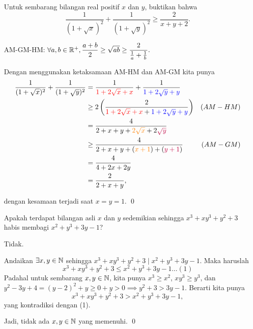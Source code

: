 \documentclass[12pt]{scrartcl}
\begin{document}
	\begin{soaljawab}
	Untuk sembarang bilangan real positif $x$ dan $y$, buktikan bahwa $$\dfrac{1}{(1+\sqrt{x})^2}+\dfrac{1}{(1+\sqrt{y})^2} \ge \dfrac{2}{x+y+2}.$$
	\begin{solusi}
	
	\begin{lemmarev}
	AM-GM-HM: $\forall a,b \in \mathbb R^+, \dfrac{a+b}{2} \ge \sqrt{ab} \ge \dfrac{2}{\frac{1}{a}+\frac{1}{b}}.$
	\end{lemmarev}
	
	Dengan menggunakan ketaksamaan AM-HM dan AM-GM kita punya
	\begin{align*}
		\dfrac{1}{(1+\sqrt{x})^2}+\dfrac{1}{(1+\sqrt{y})^2} 
		&= \dfrac{1}{\color{red}1+2\sqrt{x}+x}+\dfrac{1}{\color{blue}1+2\sqrt{y}+y}  \\
		&\ge 2\left(\dfrac{2}{{\color{red}1+2\sqrt{x}+x}+{\color{blue}1+2\sqrt{y}+y}}\right) & (AM-HM)\\
		&= \dfrac{4}{2+x+y+{\color{orange}2\sqrt{x}}+{2\color{purple}\sqrt{y}}}\\
		&\ge \dfrac{4}{2+x+y+({\color{orange}x+1})+({\color{purple}y+1})}  & (AM-GM)\\
		&= \dfrac{4}{4+2x+2y}\\
		&= \dfrac{2}{2+x+y},
	\end{align*}
	
	dengan kesamaan terjadi saat $x=y=1$. \qed
	\end{solusi}
	
	\end{soaljawab}
	
	\begin{soaljawab} Apakah terdapat bilangan asli $x$ dan $y$ sedemikian sehingga $x^3+xy^3+y^2+3$ habis membagi $x^2+y^3+3y-1$?
	\begin{jawaban}
	Tidak.
	\end{jawaban}
	\begin{solusi}
	Andaikan $\exists x,y \in \mathbb N$ sehingga $x^3+xy^3+y^2+3 \mid x^2+y^3+3y-1$. Maka haruslah 
	 $$x^3+xy^3+y^2+3 \le x^2+y^3+3y-1 \dots (1)$$
	Padahal untuk sembarang $x,y \in \mathbb N$, kita punya $x^3 \ge x^2$,   $xy^3 \ge y^3$, dan\\ $y^2-3y+4 = (y-2)^2+y \ge 0 + y > 0 \implies y^2+3 > 3y -1$. Berarti kita punya $$x^3+xy^3+y^2+3 > x^2+y^3+3y-1,$$ yang kontradiksi dengan (1).
	
	Jadi, tidak ada $x,y \in \mathbb N$ yang memenuhi. \qed
	\end{solusi}
	\end{soaljawab}
	
\end{document}
